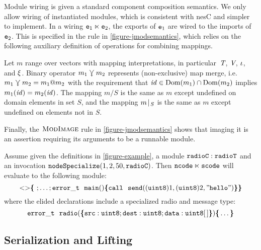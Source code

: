 Module wiring is given a standard component composition semantics. We only allow wiring of
instantiated modules, which is consistent with nesC and simpler to implement. In a wiring
$\jwire{\tt{e}_1}{\tt{e}_2}$, the exports of $\tt{e}_1$ are wired to the imports of $\tt{e}_2$.
This is specified in the  rule in \autoref{figure-jmodsemantics}, which relies
on the following auxiliary definition of operations for combining mappings.
\begin{definition}
  Let $m$ range over vectors with mapping interpretations, in particular~$\tpdecl$, $\vpdecl$,
  $\imports$, and $\exports$. Binary operator $m_1\maploosemerge m_2$ represents (non-exclusive)
  map merge, i.e.~$m_1 \maploosemerge m_2 = m_1 @ m_2$ with the requirement that $\identifier\in
  \dom(m_1)\cap\dom(m_2)$ implies $m_1(\identifier) = m_2(\identifier)$.
  The mapping $m / S$ is the same as $m$ except undefined on domain elements in set $S$, and the
  mapping $\restrict{m}{S}$ is the same as $m$ except undefined on elements not in ${S}$.
\end{definition}
Finally, the $\TirName{ModImage}$ rule in \autoref{figure-jmodsemantics} shows that imaging it
is an assertion requiring its arguments to be a runnable module.

\begin{exmp}
\label{example-scalanesssemantics}
Assume given the definitions in \autoref{figure-example}, a module $\tt{radioC : radioT}$ and an
invocation $\tt{nodeSpecialize}(1,2,50,\tt{radioC})$. Then $\tt{ncode} \ltimes \tt{scode}$ will
evaluate to the following module:
$$
\margs{}\lc\ ; \ldots; \tt{error\_t\ \ main()} \lc \tt{call}\ \ \tt{send}((\tt{uint8})1, (\tt{uint8})2, "\tt{hello}") \rc\rc
$$  
where the elided declarations include a specialized radio and message type:
$$
\tt{error\_t\ \ radio(\lc \tt{src : uint8}; \tt{dest : uint8}; \tt{data : uint8[\,]} \rc)} \lc \ldots \rc
$$
\end{exmp}

\subsection{Serialization and Lifting}
\label{section-serialization}

